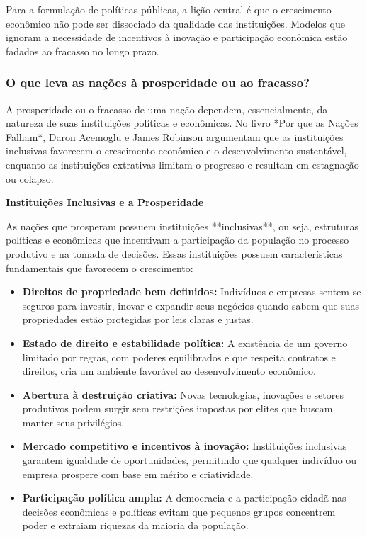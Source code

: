 \documentclass[a4paper,12pt]{article}[abntex2]
\begin{document}
Para a formulação de políticas públicas, a lição central é que o crescimento econômico não pode ser dissociado da qualidade das instituições. Modelos que ignoram a necessidade de incentivos à inovação e participação econômica estão fadados ao fracasso no longo prazo.

\subsubsection{\textbf{O que leva as nações à prosperidade ou ao fracasso?}}

A prosperidade ou o fracasso de uma nação dependem, essencialmente, da natureza de suas instituições políticas e econômicas. No livro *Por que as Nações Falham*, Daron Acemoglu e James Robinson argumentam que as instituições inclusivas favorecem o crescimento econômico e o desenvolvimento sustentável, enquanto as instituições extrativas limitam o progresso e resultam em estagnação ou colapso.

\textbf{Instituições Inclusivas e a Prosperidade}

As nações que prosperam possuem instituições **inclusivas**, ou seja, estruturas políticas e econômicas que incentivam a participação da população no processo produtivo e na tomada de decisões. Essas instituições possuem características fundamentais que favorecem o crescimento:

\begin{itemize}
    \item \textbf{Direitos de propriedade bem definidos:} Indivíduos e empresas sentem-se seguros para investir, inovar e expandir seus negócios quando sabem que suas propriedades estão protegidas por leis claras e justas.
    
    \item \textbf{Estado de direito e estabilidade política:} A existência de um governo limitado por regras, com poderes equilibrados e que respeita contratos e direitos, cria um ambiente favorável ao desenvolvimento econômico.
    
    \item \textbf{Abertura à destruição criativa:} Novas tecnologias, inovações e setores produtivos podem surgir sem restrições impostas por elites que buscam manter seus privilégios.
    
    \item \textbf{Mercado competitivo e incentivos à inovação:} Instituições inclusivas garantem igualdade de oportunidades, permitindo que qualquer indivíduo ou empresa prospere com base em mérito e criatividade.
    
    \item \textbf{Participação política ampla:} A democracia e a participação cidadã nas decisões econômicas e políticas evitam que pequenos grupos concentrem poder e extraiam riquezas da maioria da população.
\end{itemize}
\end{document}
